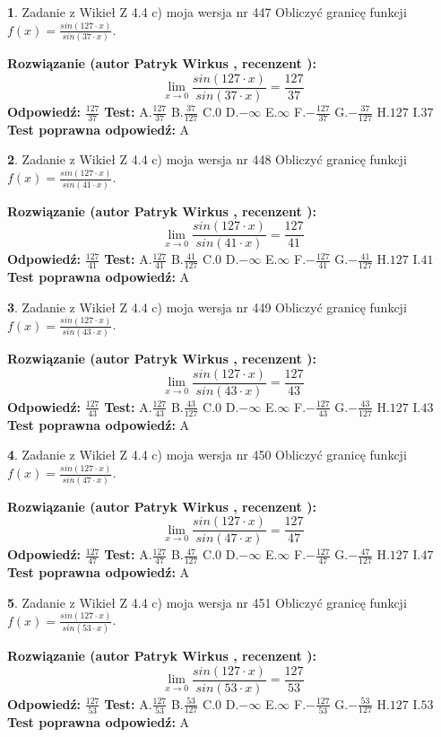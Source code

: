\documentclass[12pt, a4paper]{article}
\theoremstyle{definition} %
\newtheorem{zad}{}
\newcommand{\zadStart}[1]{\begin{zad}#1\newline}
\newcommand{\zadStop}{\end{zad}}
\newcommand{\rozwStart}[2]{\noindent \textbf{Rozwiązanie (autor #1 , recenzent #2): }\newline}
\newcommand{\rozwStop}{\newline}
\newcommand{\odpStart}{\noindent \textbf{Odpowiedź:}\newline}
\newcommand{\odpStop}{\newline}
\newcommand{\testStart}{\noindent \textbf{Test:}\newline}
\newcommand{\testStop}{\newline}
\newcommand{\kluczStart}{\noindent \textbf{Test poprawna odpowiedź:}\newline}
\newcommand{\kluczStop}{\newline}
\begin{document}
\zadStart{Zadanie z Wikieł Z 4.4 c) moja wersja nr 447}
Obliczyć granicę funkcji $f(x)=\frac{sin(127\cdot x)}{sin(37\cdot x)}$.
\zadStop
\rozwStart{Patryk Wirkus}{}
$$\lim\limits_{x\to 0}\frac{sin(127\cdot x)}{sin(37\cdot x)}=
\frac{127}{37}$$
\rozwStop
\odpStart
$\frac{127}{37}$
\odpStop
\testStart
A.$\frac{127}{37}$
B.$\frac{37}{127}$
C.$0$
D.$-\infty$
E.$\infty$
F.$-\frac{127}{37}$
G.$-\frac{37}{127}$
H.$127$
I.$37$
\testStop
\kluczStart
A
\kluczStop



\zadStart{Zadanie z Wikieł Z 4.4 c) moja wersja nr 448}
Obliczyć granicę funkcji $f(x)=\frac{sin(127\cdot x)}{sin(41\cdot x)}$.
\zadStop
\rozwStart{Patryk Wirkus}{}
$$\lim\limits_{x\to 0}\frac{sin(127\cdot x)}{sin(41\cdot x)}=
\frac{127}{41}$$
\rozwStop
\odpStart
$\frac{127}{41}$
\odpStop
\testStart
A.$\frac{127}{41}$
B.$\frac{41}{127}$
C.$0$
D.$-\infty$
E.$\infty$
F.$-\frac{127}{41}$
G.$-\frac{41}{127}$
H.$127$
I.$41$
\testStop
\kluczStart
A
\kluczStop



\zadStart{Zadanie z Wikieł Z 4.4 c) moja wersja nr 449}
Obliczyć granicę funkcji $f(x)=\frac{sin(127\cdot x)}{sin(43\cdot x)}$.
\zadStop
\rozwStart{Patryk Wirkus}{}
$$\lim\limits_{x\to 0}\frac{sin(127\cdot x)}{sin(43\cdot x)}=
\frac{127}{43}$$
\rozwStop
\odpStart
$\frac{127}{43}$
\odpStop
\testStart
A.$\frac{127}{43}$
B.$\frac{43}{127}$
C.$0$
D.$-\infty$
E.$\infty$
F.$-\frac{127}{43}$
G.$-\frac{43}{127}$
H.$127$
I.$43$
\testStop
\kluczStart
A
\kluczStop



\zadStart{Zadanie z Wikieł Z 4.4 c) moja wersja nr 450}
Obliczyć granicę funkcji $f(x)=\frac{sin(127\cdot x)}{sin(47\cdot x)}$.
\zadStop
\rozwStart{Patryk Wirkus}{}
$$\lim\limits_{x\to 0}\frac{sin(127\cdot x)}{sin(47\cdot x)}=
\frac{127}{47}$$
\rozwStop
\odpStart
$\frac{127}{47}$
\odpStop
\testStart
A.$\frac{127}{47}$
B.$\frac{47}{127}$
C.$0$
D.$-\infty$
E.$\infty$
F.$-\frac{127}{47}$
G.$-\frac{47}{127}$
H.$127$
I.$47$
\testStop
\kluczStart
A
\kluczStop



\zadStart{Zadanie z Wikieł Z 4.4 c) moja wersja nr 451}
Obliczyć granicę funkcji $f(x)=\frac{sin(127\cdot x)}{sin(53\cdot x)}$.
\zadStop
\rozwStart{Patryk Wirkus}{}
$$\lim\limits_{x\to 0}\frac{sin(127\cdot x)}{sin(53\cdot x)}=
\frac{127}{53}$$
\rozwStop
\odpStart
$\frac{127}{53}$
\odpStop
\testStart
A.$\frac{127}{53}$
B.$\frac{53}{127}$
C.$0$
D.$-\infty$
E.$\infty$
F.$-\frac{127}{53}$
G.$-\frac{53}{127}$
H.$127$
I.$53$
\testStop
\kluczStart
A
\kluczStop
\end{document}
